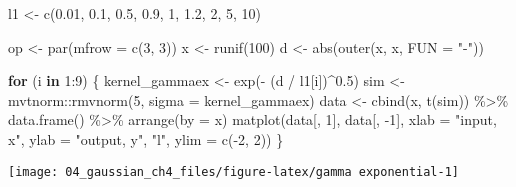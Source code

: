 \documentclass[
]{article}
\newenvironment{Shaded}{\begin{snugshade}}{\end{snugshade}}
\newcommand{\AttributeTok}[1]{\textcolor[rgb]{0.77,0.63,0.00}{#1}}
\newcommand{\ControlFlowTok}[1]{\textcolor[rgb]{0.13,0.29,0.53}{\textbf{#1}}}
\newcommand{\DecValTok}[1]{\textcolor[rgb]{0.00,0.00,0.81}{#1}}
\newcommand{\FloatTok}[1]{\textcolor[rgb]{0.00,0.00,0.81}{#1}}
\newcommand{\FunctionTok}[1]{\textcolor[rgb]{0.00,0.00,0.00}{#1}}
\newcommand{\NormalTok}[1]{#1}
\newcommand{\OtherTok}[1]{\textcolor[rgb]{0.56,0.35,0.01}{#1}}
\newcommand{\SpecialCharTok}[1]{\textcolor[rgb]{0.00,0.00,0.00}{#1}}
\newcommand{\StringTok}[1]{\textcolor[rgb]{0.31,0.60,0.02}{#1}}
\begin{document}
\begin{Shaded}
\begin{Highlighting}[]
\NormalTok{l1 }\OtherTok{\textless{}{-}} \FunctionTok{c}\NormalTok{(}\FloatTok{0.01}\NormalTok{, }\FloatTok{0.1}\NormalTok{,  }\FloatTok{0.5}\NormalTok{,}
         \FloatTok{0.9}\NormalTok{,   }\DecValTok{1}\NormalTok{,  }\FloatTok{1.2}\NormalTok{, }
           \DecValTok{2}\NormalTok{,   }\DecValTok{5}\NormalTok{,  }\DecValTok{10}\NormalTok{)}

\NormalTok{op }\OtherTok{\textless{}{-}} \FunctionTok{par}\NormalTok{(}\AttributeTok{mfrow =} \FunctionTok{c}\NormalTok{(}\DecValTok{3}\NormalTok{, }\DecValTok{3}\NormalTok{))}
\NormalTok{x }\OtherTok{\textless{}{-}} \FunctionTok{runif}\NormalTok{(}\DecValTok{100}\NormalTok{)}
\NormalTok{d }\OtherTok{\textless{}{-}} \FunctionTok{abs}\NormalTok{(}\FunctionTok{outer}\NormalTok{(x, x, }\AttributeTok{FUN =} \StringTok{"{-}"}\NormalTok{))}

\ControlFlowTok{for}\NormalTok{ (i }\ControlFlowTok{in} \DecValTok{1}\SpecialCharTok{:}\DecValTok{9}\NormalTok{) \{}
\NormalTok{  kernel\_gammaex }\OtherTok{\textless{}{-}} \FunctionTok{exp}\NormalTok{(}\SpecialCharTok{{-}}\NormalTok{ (d }\SpecialCharTok{/}\NormalTok{ l1[i])}\SpecialCharTok{\^{}}\FloatTok{0.5}\NormalTok{) }
\NormalTok{  sim }\OtherTok{\textless{}{-}}\NormalTok{ mvtnorm}\SpecialCharTok{::}\FunctionTok{rmvnorm}\NormalTok{(}\DecValTok{5}\NormalTok{, }\AttributeTok{sigma =}\NormalTok{ kernel\_gammaex)}
\NormalTok{  data }\OtherTok{\textless{}{-}} \FunctionTok{cbind}\NormalTok{(x, }\FunctionTok{t}\NormalTok{(sim)) }\SpecialCharTok{\%\textgreater{}\%} 
    \FunctionTok{data.frame}\NormalTok{() }\SpecialCharTok{\%\textgreater{}\%}
    \FunctionTok{arrange}\NormalTok{(}\AttributeTok{by =}\NormalTok{ x)}
  \FunctionTok{matplot}\NormalTok{(data[, }\DecValTok{1}\NormalTok{], data[, }\SpecialCharTok{{-}}\DecValTok{1}\NormalTok{], }
          \AttributeTok{xlab =} \StringTok{"input, x"}\NormalTok{, }\AttributeTok{ylab =} \StringTok{"output, y"}\NormalTok{,}
          \StringTok{"l"}\NormalTok{, }\AttributeTok{ylim =} \FunctionTok{c}\NormalTok{(}\SpecialCharTok{{-}}\DecValTok{2}\NormalTok{, }\DecValTok{2}\NormalTok{))}
\NormalTok{\}}
\end{Highlighting}
\end{Shaded}

\begin{center}\texttt{[image: 04\_gaussian\_ch4\_files/figure-latex/gamma exponential-1]} \end{center}
\end{document}
